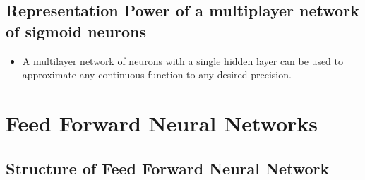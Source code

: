 \documentclass[a4paper]{article}
\begin{document}
\subsection{Representation Power of a multiplayer network of sigmoid neurons}
\begin{itemize}
    \item A multilayer network of neurons with a single hidden layer can be used to approximate any continuous function to any desired precision.
\end{itemize}

\section{Feed Forward Neural Networks}
\subsection{Structure of Feed Forward Neural Network}
\end{document}
